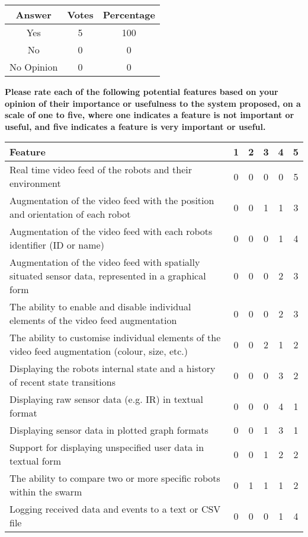 \begin{center}
\begin{tabular}{ c c c }
 Answer & Votes & Percentage \\ 
 \hline
 Yes & 5 & 100 \\ 
 No & 0 & 0 \\
 No Opinion & 0 & 0 \\
\end{tabular}
\end{center}

\vspace{2cm}

\textbf{Please rate each of the following potential features based on your opinion of their importance or usefulness to the system proposed, on a scale of one to five, where one indicates a feature is not important or useful, and five indicates a feature is very important or useful.}

\begin{center}
\begin{tabular}{ p{10cm} c c c c c }
 Feature & 1 & 2 & 3 & 4 & 5 \\ 
 \hline
 Real time video feed of the robots and their environment & 0 & 0 & 0 & 0 & 5\\
 Augmentation of the video feed with the position and orientation of each robot & 0 & 0 & 1 & 1 & 3\\
 Augmentation of the video feed with each robots identifier (ID or name) & 0 & 0 & 0 & 1 & 4\\
 Augmentation of the video feed with spatially situated sensor data, represented in a graphical form & 0 & 0 & 0 & 2 & 3\\
 The ability to enable and disable individual elements of the video feed augmentation & 0 & 0 & 0 & 2 & 3\\
 The ability to customise individual elements of the video feed augmentation (colour, size, etc.) & 0 & 0 & 2 & 1 & 2\\
 Displaying the robots internal state and a history of recent state transitions & 0 & 0 & 0 & 3 & 2\\
 Displaying raw sensor data (e.g. IR) in textual format & 0 & 0 & 0 & 4 & 1\\
 Displaying sensor data in plotted graph formats & 0 & 0 & 1 & 3 & 1\\
 Support for displaying unspecified user data in textual form & 0 & 0 & 1 & 2 & 2\\
 The ability to compare two or more specific robots within the swarm & 0 & 1 & 1 & 1 & 2\\
 Logging received data and events to a text or CSV file & 0 & 0 & 0 & 1 & 4\\
\end{tabular}
\end{center}

